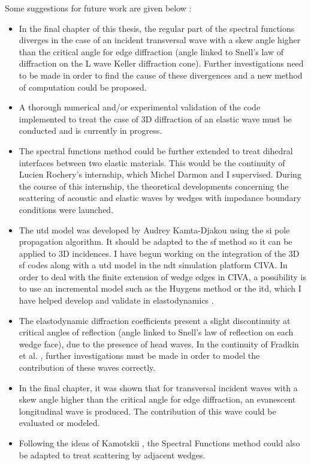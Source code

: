 Some suggestions for future work are given below :
\begin{itemize}
\item In the final chapter of this thesis, the regular part of the spectral functions diverges in the case of an incident transversal wave with a skew angle higher than the critical angle for edge diffraction (angle linked to Snell's law of diffraction on the L wave Keller diffraction cone). Further investigations need to be made in order to find the cause of these divergences and a new method of computation could be proposed.
\item A thorough numerical and/or experimental validation of the code implemented to treat the case of 3D diffraction of an elastic wave must be conducted and is currently in progress.
\item The spectral functions method could be further extended to treat dihedral interfaces between two elastic materials. This would be the continuity of Lucien Rochery's internship, which Michel Darmon and I supervised. During the course of this internship, the theoretical developments concerning the scattering of acoustic and elastic waves by wedges with impedance boundary conditions were launched.
\item The \acrshort{utd} model was developed by Audrey Kamta-Djakou \cite{AKDthese} using the \acrfull{si} pole propagation algorithm. It should be adapted to the \acrshort{sf} method so it can be applied to 3D incidences. I have begun working on the integration of the 3D \acrshort{sf} codes along with a \acrshort{utd} model in the \acrshort{ndt} simulation platform CIVA. In order to deal with the finite extension of wedge edges in CIVA, a possibility is to use an incremental model such as the Huygens method or the \acrfull{itd}, which I have helped develop and validate in elastodynamics \cite{articleITD}.
\item The elastodynamic diffraction coefficients present a slight discontinuity at critical angles of reflection (angle linked to Snell's law of reflection on each wedge face), due to the presence of head waves. In the continuity of Fradkin et al. \cite{FradkinDarmon,HDRMichel}, further investigations must be made in order to model the contribution of these waves correctly.
\item In the final chapter, it was shown that for transversal incident waves with a skew angle higher than the critical angle for edge diffraction, an evanescent longitudinal wave is produced. The contribution of this wave could be evaluated or modeled.
\item Following the ideas of Kamotskii \cite{Kamotski2}, the Spectral Functions method could also be adapted to treat scattering by adjacent wedges.
\end{itemize}